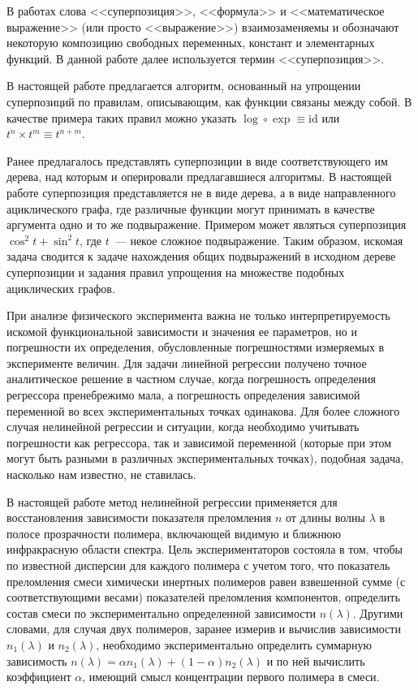 \documentclass[12pt,a4paper]{article}
\begin{document}
В работах \cite{Ehrig2006,EhrigHandbook,MoriSimpl} слова
<<суперпозиция>>, <<формула>> и <<математическое выражение>>
(или просто <<выражение>>) взаимозаменяемы и обозначают некоторую композицию
свободных переменных, констант и элементарных функций. В данной работе далее используется
термин <<суперпозиция>>.

В настоящей работе предлагается алгоритм, основанный на упрощении суперпозиций по
правилам, описывающим, как функции связаны между собой. В качестве примера таких правил
можно указать $\log \circ \exp \equiv \text{id}$ или $t^n \times t^m \equiv t^{n+m}$.

Ранее предлагалось \cite{Sasaki86,Soule98,Carette04,Stoutemyer11,Stoutemyer12} представлять
суперпозиции в виде соответствующего им дерева, над которым и оперировали предлагавшиеся
алгоритмы. В настоящей работе суперпозиция представляется не в виде дерева, а в виде
направленного ациклического графа, где различные функции могут принимать в
качестве аргумента одно и то же подвыражение. Примером может являться суперпозиция
$\cos^2 t + \sin^2 t$, где $t$~--- некое сложное подвыражение. Таким образом,
искомая задача сводится к задаче нахождения общих подвыражений в исходном
дереве суперпозиции и задания правил упрощения на множестве подобных
ациклических графов.

При анализе физического эксперимента важна не только интерпретируемость
искомой функциональной зависимости и значения ее параметров, но и погрешности их определения,
обусловленные погрешностями измеряемых в эксперименте величин. Для задачи
линейной регрессии получено точное аналитическое решение в частном случае, когда
погрешность определения регрессора пренебрежимо мала, а погрешность определения
зависимой переменной во всех экспериментальных точках одинакова\cite{Vatunin05}.
Для более сложного случая нелинейной регрессии и ситуации, когда необходимо
учитывать погрешности как регрессора, так и зависимой переменной (которые при
этом могут быть разными в различных экспериментальных точках), подобная задача,
насколько нам известно, не ставилась.

В настоящей работе метод нелинейной регрессии применяется для восстановления
зависимости показателя преломления $n$ от длины волны $\lambda$ в полосе
прозрачности полимера, включающей видимую и ближнюю инфракрасную области спектра.
Цель экспериментаторов состояла в том, чтобы по известной дисперсии для каждого
полимера с учетом того, что показатель преломления смеси химически инертных
полимеров равен взвешенной сумме (с соответствующими весами) показателей
преломления компонентов, определить состав смеси по экспериментально
определенной зависимости $n(\lambda)$. Другими словами, для случая двух
полимеров, заранее измерив и вычислив зависимости $n_1(\lambda)$ и $n_2(\lambda)$,
необходимо экспериментально определить суммарную зависимость
$n(\lambda) = \alpha n_1(\lambda) + (1 - \alpha) n_2(\lambda)$ и по ней
вычислить коэффициент $\alpha$, имеющий смысл концентрации первого полимера в
смеси.
\end{document}

